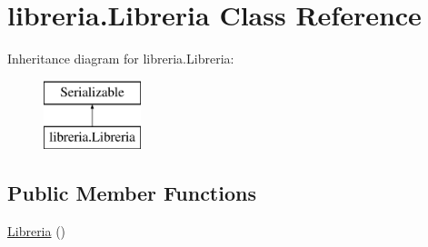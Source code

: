 \hypertarget{classlibreria_1_1_libreria}{}\section{libreria.\+Libreria Class Reference}
\label{classlibreria_1_1_libreria}
Inheritance diagram for libreria.\+Libreria\+:\begin{figure}[H]
\begin{center}
\leavevmode
\includegraphics[height=2.000000cm]{classlibreria_1_1_libreria}
\end{center}
\end{figure}
\subsection*{Public Member Functions}
\begin{DoxyCompactItemize}
\item 
\mbox{\hyperlink{classlibreria_1_1_libreria_a93220dd4de47ee3b7ef4b2a90701c253}{Libreria}} ()
\end{DoxyCompactItemize}
